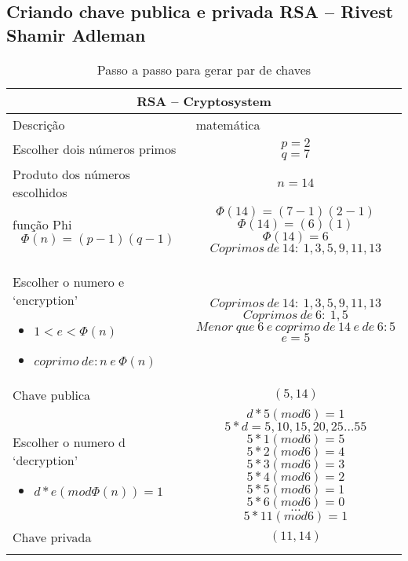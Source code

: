 \subsection{Criando chave publica e privada RSA – Rivest Shamir Adleman}

\vspace{1cm}
\begin{longtable}{ |p{6cm}|| p{8cm}|  }
  \hline
  \multicolumn{2}{|c|}{RSA – Cryptosystem} \\
  \hline
    Descrição & matemática\\
  \hline
    Escolher dois números primos & 
    \[p=2\] \[q=7\]\\
  \hline
    Produto dos números escolhidos & 
    \[n=14\]\\
  \hline
    função Phi 
    \[\Phi(n)=(p-1)(q-1)\] & 
    \[\Phi(14)=(7-1)(2-1)\]
    \[\Phi(14)=(6)(1)\]
    \[\Phi(14)=6\]
    \[Coprimos\: de\: 14:\: 1, 3, 5, 9, 11, 13\]\\
  \hline
    Escolher o numero e `encryption'
    \begin{itemize}
      \item $1 < e < \Phi(n)$
      \item $coprimo\: de: n\: e\: \Phi(n)$
    \end{itemize} &
    \[Coprimos\: de\: 14:\: 1, 3, 5, 9, 11, 13\]
    \[Coprimos\: de\: 6:\: 1, 5\]
    \[Menor\: que\: 6\: e\: coprimo\: de\: 14\: e\: de\: 6: 5\]
    \[e = 5\]\\
  \hline
    Chave publica & 
    \[(5, 14)\]\\
  \hline
  Escolher o numero d `decryption'
    \begin{itemize}
      \item $d * e (mod \Phi(n)) = 1$
    \end{itemize} & 
    \[d * 5 (mod 6) = 1\]
    \[5*d = 5, 10, 15, 20, 25 \dots 55\]
    \[5*1 (mod 6) = 5\]
    \[5*2 (mod 6) = 4\]
    \[5*3 (mod 6) = 3\]
    \[5*4 (mod 6) = 2\]
    \[5*5 (mod 6) = 1\]
    \[5*6 (mod 6) = 0\]
    \[ \dots \]
    \[5*11 (mod 6) = 1\] \\
  \hline
  Chave privada & 
  \[(11, 14)\]\\
  \hline
  \caption{Passo a passo para gerar par de chaves}
  \label{table:3}
\end{longtable}

